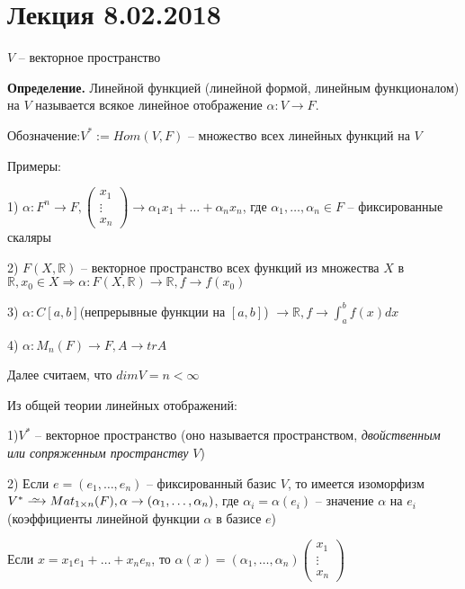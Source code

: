 \section{Лекция 8.02.2018}

$V$ -- векторное пространство

\textbf{Определение.} Линейной функцией (линейной формой, линейным функционалом) на $V$ называется всякое линейное отображение $\alpha : V \rightarrow F$.

Обозначение:$V^{*} := Hom(V, F)$ -- множество всех линейных функций на $V$

\vspace{\baselineskip}
Примеры:

1) $\alpha : F^n \rightarrow F, \begin{pmatrix} x_1 \\ \vdots \\ x_n \end{pmatrix} \rightarrow \alpha_1 x_1 + \dots + \alpha_n x_n$, где $\alpha_1, \dots, \alpha_n \in F$ -- фиксированные скаляры

2) $F(X, \mathbb{R})$ -- векторное пространство всех функций из множества $X$ в $\mathbb{R}, x_0 \in X \Rightarrow \alpha : F(X, \mathbb{R}) \rightarrow \mathbb{R}, f \rightarrow f(x_0)$

3) $\alpha : C[a, b]$(непрерывные функции на $[a, b]$) $\rightarrow \mathbb{R}, f \rightarrow \int^b_a f(x) dx$ 

4) $\alpha: M_n(F) \rightarrow F, A \rightarrow trA$

\vspace{\baselineskip}
Далее считаем, что $dimV = n < \infty$

Из общей теории линейных отображений:

1)$V^{*}$ -- векторное пространство (оно называется пространством, \textit{двойственным или сопряженным пространству} $V$)

2) Если $e = (e_1, \dots, e_n)$ -- фиксированный базис $V$, то имеется изоморфизм $V^{*} \iso Mat_{1 \times n}(F), \alpha \rightarrow (\alpha_1, \dots, \alpha_n)$, где $\alpha_i = \alpha(e_i)$ -- значение $\alpha$ на $e_i$ (коэффициенты линейной функции $\alpha$ в базисе $e$)

Если $x = x_1 e_1 + \dots + x_n e_n$, то $\alpha(x) = (\alpha_1, \dots, \alpha_n) \begin{pmatrix} x_1 \\ \vdots \\ x_n \end{pmatrix}$

